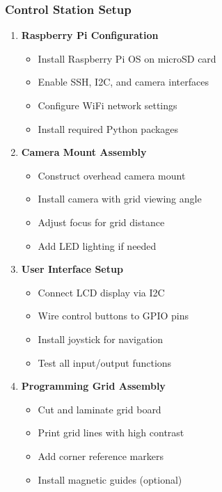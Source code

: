 \subsubsection{Control Station Setup}

\begin{enumerate}
    \item \textbf{Raspberry Pi Configuration}
    \begin{itemize}
        \item Install Raspberry Pi OS on microSD card
        \item Enable SSH, I2C, and camera interfaces
        \item Configure WiFi network settings
        \item Install required Python packages
    \end{itemize}
    
    \item \textbf{Camera Mount Assembly}
    \begin{itemize}
        \item Construct overhead camera mount
        \item Install camera with grid viewing angle
        \item Adjust focus for grid distance
        \item Add LED lighting if needed
    \end{itemize}
    
    \item \textbf{User Interface Setup}
    \begin{itemize}
        \item Connect LCD display via I2C
        \item Wire control buttons to GPIO pins
        \item Install joystick for navigation
        \item Test all input/output functions
    \end{itemize}
    
    \item \textbf{Programming Grid Assembly}
    \begin{itemize}
        \item Cut and laminate grid board
        \item Print grid lines with high contrast
        \item Add corner reference markers
        \item Install magnetic guides (optional)
    \end{itemize}
\end{enumerate}

